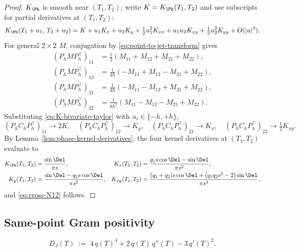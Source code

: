 \begin{proof}
\(K_\Ph\) is smooth near \((T_1,T_2)\); write \(K=K_\Ph(T_1,T_2)\)
and use subscripts for partial derivatives at \((T_1,T_2)\):
\begin{equation}
\label{eq:K-bivariate-taylor}
K_\Ph(T_1+u_1,\,T_2+u_2)
= K + u_1 K_x + u_2 K_y
  + \tfrac12 u_1^2 K_{xx} + u_1 u_2 K_{xy} + \tfrac12 u_2^2 K_{yy}
  + O(|u|^3).
\end{equation}
For general \(2\times 2\) \(M\), conjugation by
\eqref{eq:point-to-jet-transform} gives
\begin{align*}
(P_h M P_h^\top)_{11}
&= \tfrac12(M_{11}+M_{12}+M_{21}+M_{22}),\\
(P_h M P_h^\top)_{12}
&= \tfrac{1}{4h}(-M_{11}+M_{12}-M_{21}+M_{22}),\\
(P_h M P_h^\top)_{21}
&= \tfrac{1}{4h}(-M_{11}-M_{12}+M_{21}+M_{22}),\\
(P_h M P_h^\top)_{22}
&= \tfrac{1}{8h^2}(M_{11}-M_{12}-M_{21}+M_{22}).
\end{align*}
Substituting \eqref{eq:K-bivariate-taylor} with
\(u_i\in\{-h,+h\}\),
\[
(P_h C_h P_h^\top)_{11}\to 2K,\quad
(P_h C_h P_h^\top)_{12}\to K_y,\quad
(P_h C_h P_h^\top)_{21}\to K_x,\quad
(P_h C_h P_h^\top)_{22}\to \tfrac12 K_{xy}.
\]
By Lemma~\ref{lem:phase-kernel-derivatives}, the four kernel
derivatives at \((T_1,T_2)\) evaluate to
\begin{align*}
K_\Ph(T_1,T_2) &= \frac{\sin\Del}{\pi s},
&K_x(T_1,T_2) &= \frac{q_1 s\cos\Del - \sin\Del}{\pi s^2},\\
K_y(T_1,T_2) &= \frac{\sin\Del - q_2 s\cos\Del}{\pi s^2},
&K_{xy}(T_1,T_2)
&= \frac{(q_1+q_2) s\cos\Del + (q_1 q_2 s^2 - 2)\sin\Del}{\pi s^3},
\end{align*}
and \eqref{eq:cross-N12} follows.
\end{proof}

\subsection{Same-point Gram positivity}
\label{subsec:same-point-gram-positivity}

\begin{definition}
\label{def:same-point-gram-determinant}
\begin{equation}
\label{eq:same-point-gram-determinant}
D_J(T) \;:=\; 4\,q(T)^4 + 2\,q(T)\,q''(T) - 3\,q'(T)^2.
\end{equation}
\end{definition}

